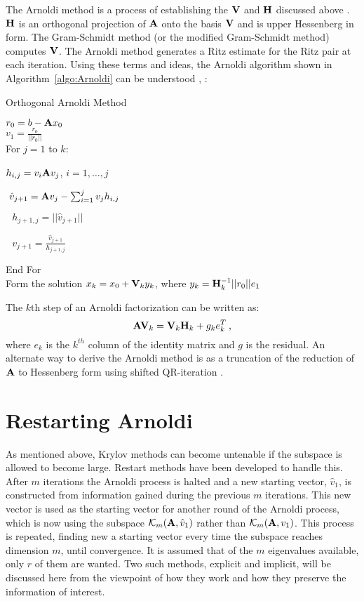 The Arnoldi method is a process of establishing the $\mathbf{V}$ and $\mathbf{H}$ discussed above \cite{Stewart2001}. $\mathbf{H}$ is an orthogonal projection of $\mathbf{A}$ onto the basis $\mathbf{V}$ and is upper Hessenberg in form. The Gram-Schmidt method (or the modified Gram-Schmidt method) computes $\mathbf{V}$. The Arnoldi method generates a Ritz estimate for the Ritz pair at each iteration. Using these terms and ideas, the Arnoldi algorithm shown in Algorithm~\ref{algo:Arnoldi} can be understood \cite{Saad1986}, \cite{Sorensen1996}:
%
\begin{algorithm}
  \caption{ Orthogonal Arnoldi Method}
  $r_0 = b - \mathbf{A}x_0$ \\
  $v_1 = \frac{r_0}{||r_0||}$ \\
  For $j = 1$ to $k$: 
  \begin{list}{}{\hspace{2em}}
    \item $h_{i,j} = v_i \mathbf{A} v_j$, $i = 1, \dots, j$ 
    \item $\text{ } \hat{v}_{j+1} = \mathbf{A}v_j - \sum_{i=1}^{j} v_j h_{i,j}$ 
    \item $\text{ } h_{j+1,j} = ||\hat{v}_{j+1}||$ 
    \item $\text{ } v_{j+1} = \frac{\hat{v}_{j+1}} {h_{j+1,j}}$ 
  \end{list}
  End For \\
  Form the solution $x_k = x_0 + \mathbf{V}_k y_k$, where $y_k = \mathbf{H}_k^{-1} ||r_0|| e_1$
  \label{algo:Arnoldi}
\end{algorithm}

The $k$th step of an Arnoldi factorization can be written as: 
%
\begin{equation}
  \mathbf{AV}_{k} = \mathbf{V}_{k}\mathbf{H}_{k} + g_{k}e_{k}^{T} \:,
\end{equation} 
%
where $e_{k}$ is the $k^{th}$ column of the identity matrix and $g$ is the residual. An alternate way to derive the Arnoldi method is as a truncation of the reduction of $\mathbf{A}$ to Hessenberg form using shifted QR-iteration \cite{Sorensen1996}.

\section{Restarting Arnoldi}
As mentioned above, Krylov methods can become untenable if the subspace is allowed to become large. Restart methods have been developed to handle this. After $m$ iterations the Arnoldi process is halted and a new starting vector, $\hat{v}_1$, is constructed from information gained during the previous $m$ iterations. This new vector is used as the starting vector for another round of the Arnoldi process, which is now using the subspace $\mathcal{K}_m(\mathbf{A},\hat{v}_1)$ rather than $\mathcal{K}_m(\mathbf{A},v_1)$. This process is repeated, finding new a starting vector every time the subspace reaches dimension $m$, until convergence. It is assumed that of the $m$ eigenvalues available, only $r$ of them are wanted. Two such methods, explicit and implicit, will be discussed here from the viewpoint of how they work and how they preserve the information of interest. 

